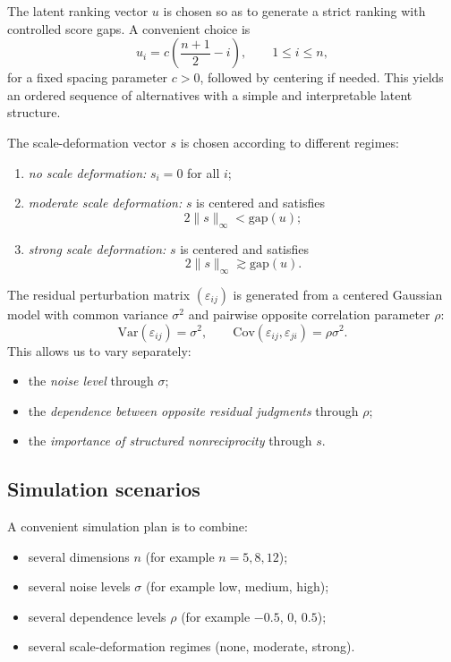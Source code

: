 \documentclass[11pt]{amsart}
\theoremstyle{definition}
\theoremstyle{plain}
\numberwithin{equation}{section}
\begin{document}
The latent ranking vector $u$ is chosen so as to generate a strict ranking with controlled score gaps. A convenient choice is
\[
u_i=c\left(\frac{n+1}{2}-i\right),
\qquad 1\le i\le n,
\]
for a fixed spacing parameter $c>0$, followed by centering if needed. This yields an ordered sequence of alternatives with a simple and interpretable latent structure.

The scale-deformation vector $s$ is chosen according to different regimes:
\begin{enumerate}[label=\textup{(\alph*)}]
\item \emph{no scale deformation:} $s_i=0$ for all $i$;
\item \emph{moderate scale deformation:} $s$ is centered and satisfies
\[
2\|s\|_\infty<\mathrm{gap}(u);
\]
\item \emph{strong scale deformation:} $s$ is centered and satisfies
\[
2\|s\|_\infty\gtrsim \mathrm{gap}(u).
\]
\end{enumerate}

The residual perturbation matrix $(\varepsilon_{ij})$ is generated from a centered Gaussian model with common variance $\sigma^2$ and pairwise opposite correlation parameter $\rho$:
\[
\mathrm{Var}(\varepsilon_{ij})=\sigma^2,
\qquad
\mathrm{Cov}(\varepsilon_{ij},\varepsilon_{ji})=\rho\sigma^2.
\]
This allows us to vary separately:
\begin{itemize}
\item the \emph{noise level} through $\sigma$;
\item the \emph{dependence between opposite residual judgments} through $\rho$;
\item the \emph{importance of structured nonreciprocity} through $s$.
\end{itemize}

\subsection{Simulation scenarios}

A convenient simulation plan is to combine:
\begin{itemize}
\item several dimensions $n$ (for example $n=5,8,12$);
\item several noise levels $\sigma$ (for example low, medium, high);
\item several dependence levels $\rho$ (for example $-0.5$, $0$, $0.5$);
\item several scale-deformation regimes (none, moderate, strong).
\end{itemize}
\end{document}
